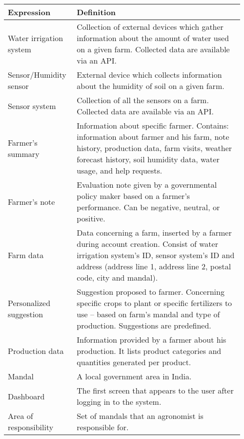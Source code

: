 \begin{center}
\begin{longtable}{@{}p{0.28\linewidth} p{0.68\linewidth}@{}}
		\toprule
		\textbf{Expression}     & \textbf{Definition}\\
		\midrule
		Water irrigation system & Collection of external devices which gather information about the amount of water used on a given farm. Collected data are available via an API. \\
        Sensor/Humidity sensor & External device which collects information about the humidity of soil on a given farm.\\
        Sensor system           & Collection of all the sensors on a farm. Collected data are available via an API.\\
        Farmer's summary        & Information about specific farmer. Contains: information about farmer and his farm, note history, production data, farm visits, weather forecast history, soil humidity data, water usage, and help requests.\\
        Farmer's note           & Evaluation note given by a governmental policy maker based on a farmer's performance. Can be negative, neutral, or positive.\\
        Farm data               & Data concerning a farm, inserted by a farmer during account creation. Consist of water irrigation system’s ID, sensor system’s ID and address (address line 1, address line 2, postal code, city and mandal).\\
        Personalized suggestion & Suggestion proposed to farmer. Concerning specific crops to plant or specific fertilizers to use – based on farm's mandal and type of production. Suggestions are predefined.\\
        Production data         & Information provided by a farmer about his production. It lists product categories and quantities generated per product.\\
        Mandal                  & A local government area in India.\\
        Dashboard               & The first screen that appears to the user after logging in to the system.\\
        Area of responsibility  & Set of mandals that an agronomist is responsible for.\\

\end{longtable}
\end{center}
